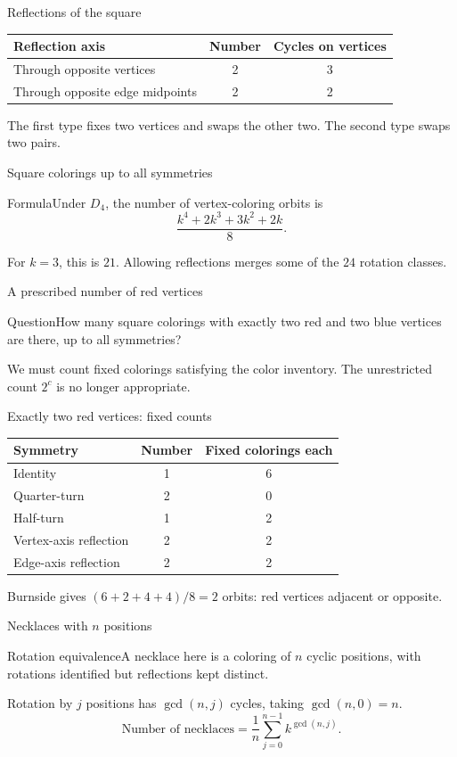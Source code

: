 \documentclass[aspectratio=169,11pt]{beamer}
\newcommand{\Def}[2]{\begin{block}{#1}#2\end{block}}
\newcommand{\Thm}[2]{\begin{block}{#1}#2\end{block}}
\newcommand{\Question}[1]{\begin{block}{Question}#1\end{block}}
\newcommand{\gap}{\par\medskip}
\begin{document}
\begin{frame}{Reflections of the square}
\large
\begin{center}\renewcommand{\arraystretch}{1.5}
\begin{tabular}{lcc}
Reflection axis & Number & Cycles on vertices\\\hline
Through opposite vertices &2&3\\
Through opposite edge midpoints &2&2
\end{tabular}\end{center}
\gap The first type fixes two vertices and swaps the other two. The second type swaps two pairs.
\end{frame}
\begin{frame}{Square colorings up to all symmetries}
\large
\Thm{Formula}{Under $D_4$, the number of vertex-coloring orbits is
\[\frac{k^4+2k^3+3k^2+2k}{8}.\]}
\gap For $k=3$, this is $21$. Allowing reflections merges some of the $24$ rotation classes.
\end{frame}
\begin{frame}{A prescribed number of red vertices}
\large
\Question{How many square colorings with exactly two red and two blue vertices are there, up to all symmetries?}
\gap We must count fixed colorings satisfying the color inventory. The unrestricted count $2^c$ is no longer appropriate.
\end{frame}
\begin{frame}{Exactly two red vertices: fixed counts}
\large
\normalsize
\begin{center}\renewcommand{\arraystretch}{1.5}
\begin{tabular}{lcc}
Symmetry & Number & Fixed colorings each\\\hline
Identity&1&6\\
Quarter-turn&2&0\\
Half-turn&1&2\\
Vertex-axis reflection&2&2\\
Edge-axis reflection&2&2
\end{tabular}\end{center}
\gap Burnside gives $(6+2+4+4)/8=2$ orbits: red vertices adjacent or opposite.
\end{frame}
\begin{frame}{Necklaces with $n$ positions}
\large
\Def{Rotation equivalence}{A necklace here is a coloring of $n$ cyclic positions, with rotations identified but reflections kept distinct.}
\gap Rotation by $j$ positions has $\gcd(n,j)$ cycles, taking $\gcd(n,0)=n$.
\[\text{Number of necklaces}=\frac1n\sum_{j=0}^{n-1}k^{\gcd(n,j)}.\]
\end{frame}
\end{document}
